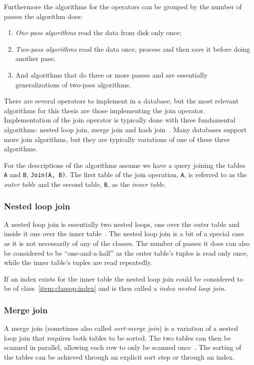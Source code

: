 Furthermore the algorithms for the operators can be grouped by the number of
passes the algorithm does:
\begin{enumerate}
\item \textit{One-pass algorithms} read the data from disk only once;
\item \textit{Two-pass algorithms} read the data once, process and then save
  it before doing another pass;
\item And algorithms that do three or more passes and are essentially
  generalizations of two-pass algorithms.
\end{enumerate}

There are several operators to implement in a database, but the most relevant
algorithms for this thesis are those implementing the join operator.
Implementation of the join operator is typically done with three fundamental
algorithms: nested loop join, merge join and hash join~\cite{postgresql_pd9p}.
Many databases support more join algorithms, but they are typically variations
of one of these three algorithms.

For the descriptions of the algorithms assume we have a query joining the tables
\texttt{A} and \texttt{B}, \texttt{Join(A, B)}. The first table of the join
operation, \texttt{A}, is referred to as the \textit{outer table} and the second
table, \texttt{B}, as the \textit{inner table}.

\subsubsection{Nested loop join}\label{sec:nestedloopjoin}
A nested loop join is essentially two nested loops, one over the outer table and
inside it one over the inner
table~\cite[p.~718-722]{garcia-molina_2002_database_dstcb}. The nested loop join
is a bit of a special case as it is not necessarily of any of the classes. The
number of passes it does can also be considered to be ``one-and-a-half'' as the
outer table's tuples is read only once, while the inner table's tuples are read
repeatedly.

If an index exists for the inner table the nested loop join could be considered
to be of class~\ref{item:classop:index} and is then called a \textit{index
  nested loop join}.

\subsubsection{Merge join}
A merge join (sometimes also called \textit{sort-merge join}) is a variation of
a nested loop join that requires both tables to be sorted. The two tables can
then be scanned in parallel, allowing each row to only be scanned
once~\cite[p.~723-730]{garcia-molina_2002_database_dstcb}. The sorting of the
tables can be achieved through an explicit sort step or through an index.

